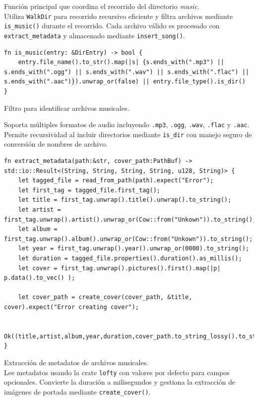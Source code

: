 \documentclass[11pt, a4paper]{article}
\begin{document}
            Función principal que coordina el recorrido del directorio \textit{music}. \\

            Utiliza \verb|WalkDir| para recorrido recursivo eficiente y filtra archivos mediante \verb|is_music()| durante el recorrido. Cada archivo válido es procesado con \verb|extract_metadata| y almacenado mediante \verb|insert_song()|.

            \begin{lstlisting}[caption={fn is\_music()}]
fn is_music(entry: &DirEntry) -> bool {
    entry.file_name().to_str().map(|s| {s.ends_with(".mp3") || s.ends_with(".ogg") || s.ends_with(".wav") || s.ends_with(".flac") || s.ends_with(".aac")}).unwrap_or(false) || entry.file_type().is_dir()
}
            \end{lstlisting}

            Filtro para identificar archivos musicales.

            Soporta múltiples formatos de audio incluyendo \verb|.mp3|, \verb|.ogg|, \verb|.wav|, \verb|.flac| y \verb|.aac|. Permite recursividad al incluir directorios mediante \verb|is_dir| con manejo seguro de conversión de nombres de archivo.

            \begin{lstlisting}[caption={fn extract\_metadata()}]
fn extract_metadata(path:&str, cover_path:PathBuf) -> std::io::Result<(String, String, String, String, u128, String)> {
    let tagged_file = read_from_path(path).expect("Error");
    let first_tag = tagged_file.first_tag();
    let title = first_tag.unwrap().title().unwrap().to_string();
    let artist = first_tag.unwrap().artist().unwrap_or(Cow::from("Unkown")).to_string();
    let album = first_tag.unwrap().album().unwrap_or(Cow::from("Unkown")).to_string();
    let year = first_tag.unwrap().year().unwrap_or(0000).to_string();
    let duration = tagged_file.properties().duration().as_millis();
    let cover = first_tag.unwrap().pictures().first().map(|p| p.data().to_vec() );

    let cover_path = create_cover(cover_path, &title, cover).expect("Error creating cover");

    Ok((title,artist,album,year,duration,cover_path.to_string_lossy().to_string()))
}
            \end{lstlisting}

            Extracción de metadatos de archivos musicales. \\

            Lee metadatos usando la crate \verb|lofty| con valores por defecto para campos opcionales. Convierte la duración a milisegundos y gestiona la extracción de imágenes de portada mediante \verb|create_cover()|.
\end{document}
